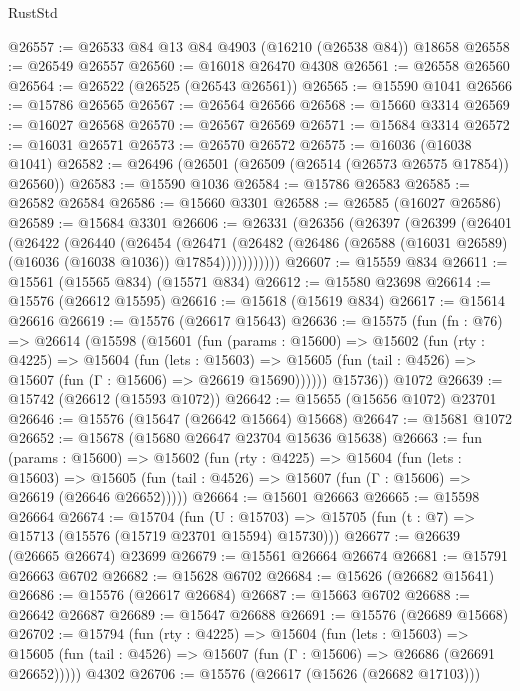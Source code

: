 \begin{lexlean}{RustStd}
\begin{coremodule}
@26557 := @26533 @84 @13 @84 @4903 (@16210 (@26538 @84)) @18658
@26558 := @26549 @26557
@26560 := @16018 @26470 @4308
@26561 := @26558 @26560
@26564 := @26522 (@26525 (@26543 @26561))
@26565 := @15590 @1041
@26566 := @15786 @26565
@26567 := @26564 @26566
@26568 := @15660 @3314
@26569 := @16027 @26568
@26570 := @26567 @26569
@26571 := @15684 @3314
@26572 := @16031 @26571
@26573 := @26570 @26572
@26575 := @16036 (@16038 @1041)
@26582 := @26496 (@26501 (@26509 (@26514 (@26573 @26575 @17854)) @26560))
@26583 := @15590 @1036
@26584 := @15786 @26583
@26585 := @26582 @26584
@26586 := @15660 @3301
@26588 := @26585 (@16027 @26586)
@26589 := @15684 @3301
@26606 := @26331
    (@26356
      (@26397
        (@26399
          (@26401
            (@26422
              (@26440
                (@26454
                  (@26471
                    (@26482
                      (@26486 (@26588 (@16031 @26589) (@16036 (@16038 @1036)) @17854)))))))))))
@26607 := @15559 @834
@26611 := @15561 (@15565 @834) (@15571 @834)
@26612 := @15580 @23698
@26614 := @15576 (@26612 @15595)
@26616 := @15618 (@15619 @834)
@26617 := @15614 @26616
@26619 := @15576 (@26617 @15643)
@26636 := @15575
    (fun (fn : @76) =>
    @26614
      (@15598
        (@15601
          (fun (params : @15600) =>
          @15602
            (fun (rty : @4225) =>
            @15604
              (fun (lets : @15603) =>
              @15605 (fun (tail : @4526) => @15607 (fun (Γ : @15606) => @26619 @15690))))))
        @15736))
    @1072
@26639 := @15742 (@26612 (@15593 @1072))
@26642 := @15655 (@15656 @1072) @23701
@26646 := @15576 (@15647 (@26642 @15664) @15668)
@26647 := @15681 @1072
@26652 := @15678 (@15680 @26647 @23704 @15636 @15638)
@26663 := fun (params : @15600) =>
  @15602
    (fun (rty : @4225) =>
    @15604
      (fun (lets : @15603) =>
      @15605 (fun (tail : @4526) => @15607 (fun (Γ : @15606) => @26619 (@26646 @26652)))))
@26664 := @15601 @26663
@26665 := @15598 @26664
@26674 := @15704
    (fun (U : @15703) => @15705 (fun (t : @7) => @15713 (@15576 (@15719 @23701 @15594) @15730)))
@26677 := @26639 (@26665 @26674) @23699
@26679 := @15561 @26664 @26674
@26681 := @15791 @26663 @6702
@26682 := @15628 @6702
@26684 := @15626 (@26682 @15641)
@26686 := @15576 (@26617 @26684)
@26687 := @15663 @6702
@26688 := @26642 @26687
@26689 := @15647 @26688
@26691 := @15576 (@26689 @15668)
@26702 := @15794
    (fun (rty : @4225) =>
    @15604
      (fun (lets : @15603) =>
      @15605 (fun (tail : @4526) => @15607 (fun (Γ : @15606) => @26686 (@26691 @26652)))))
    @4302
@26706 := @15576 (@26617 (@15626 (@26682 @17103)))

\end{coremodule}
\end{lexlean}
